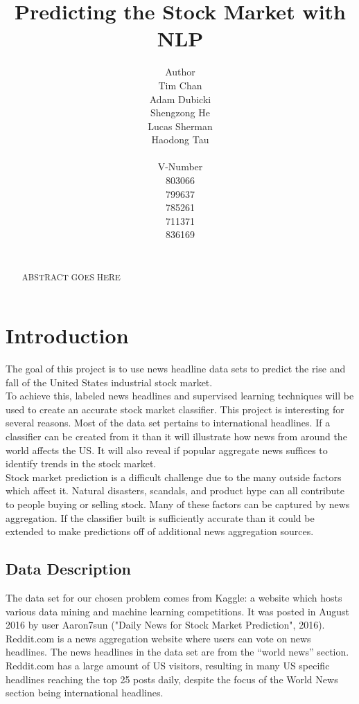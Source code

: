 \documentclass[11pt,a4paper]{article}
\title{Predicting the Stock Market with NLP}
\author{Author \\
  Tim Chan \\
  Adam Dubicki \\
  Shengzong He \\
  Lucas Sherman\\
  Haodong Tau\\
  {\tt} \\\And
  V-Number \\
  803066 \\
  799637 \\
  785261 \\
  711371\\
  836169\\
  {\tt} \\}
\date{}
\begin{document}
\maketitle
\begin{abstract}
    ABSTRACT GOES HERE
\end{abstract}


\section{Introduction}
The goal of this project is to use news headline data sets to predict the rise and fall of the United States industrial stock market.\\

To achieve this, labeled news headlines and supervised learning techniques will be used to create an accurate stock market classifier. This project is interesting for several reasons. Most of the data set pertains to international headlines. If a classifier can be created from it than it will illustrate how news from around the world affects the US. It will also reveal if popular aggregate news suffices to identify trends in the stock market.\\
  
Stock market prediction is a difficult challenge due to the many outside factors which affect it. Natural disasters, scandals, and product hype can all contribute to people buying or selling stock. Many of these factors can be captured by news aggregation. If the classifier built is sufficiently accurate than it could be extended to make predictions off of additional news aggregation sources.\\

\subsection{Data Description}
The data set for our chosen problem comes from Kaggle: a website which hosts various data mining and machine learning competitions. It was posted in August 2016 by user Aaron7sun ("Daily News for Stock Market Prediction", 2016). Reddit.com is a news aggregation website where users can vote on news headlines. The news headlines in the data set are from the “world news” section. Reddit.com has a large amount of US visitors, resulting in many US specific headlines reaching the top 25 posts daily, despite the focus of the World News section being international headlines.\\
\end{document}
